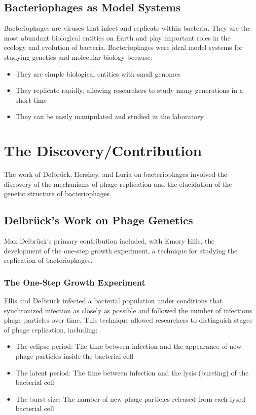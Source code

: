 \subsection{Bacteriophages as Model Systems}

Bacteriophages are viruses that infect and replicate within bacteria. They are the most abundant biological entities on Earth and play important roles in the ecology and evolution of bacteria. Bacteriophages were ideal model systems for studying genetics and molecular biology because:

\begin{itemize}
\item They are simple biological entities with small genomes
\item They replicate rapidly, allowing researchers to study many generations in a short time
\item They can be easily manipulated and studied in the laboratory
\end{itemize}

\section{The Discovery/Contribution}

The work of Delbr\"uck, Hershey, and Luria on bacteriophages involved the discovery of the mechanisms of phage replication and the elucidation of the genetic structure of bacteriophages.

\subsection{Delbr\"uck's Work on Phage Genetics}

Max Delbr\"uck's primary contribution included, with Emory Ellis, the development of the one-step growth experiment, a technique for studying the replication of bacteriophages.

\subsubsection{The One-Step Growth Experiment}

Ellis and Delbr\"uck infected a bacterial population under conditions that synchronized infection as closely as possible and followed the number of infectious phage particles over time. This technique allowed researchers to distinguish stages of phage replication, including:

\begin{itemize}
\item The eclipse period: The time between infection and the appearance of new phage particles inside the bacterial cell
\item The latent period: The time between infection and the lysis (bursting) of the bacterial cell
\item The burst size: The number of new phage particles released from each lysed bacterial cell
\end{itemize}

